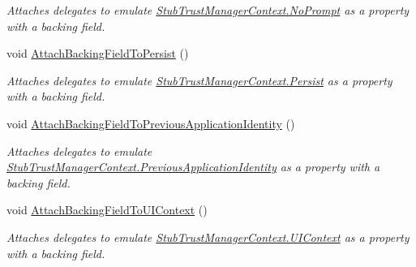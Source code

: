 \begin{DoxyCompactItemize}
\begin{DoxyCompactList}\small\item\em Attaches delegates to emulate \hyperlink{class_system_1_1_security_1_1_policy_1_1_fakes_1_1_stub_trust_manager_context_a2b850b98035e9f991050e27e4cfa82b3}{Stub\-Trust\-Manager\-Context.\-No\-Prompt} as a property with a backing field.\end{DoxyCompactList}\item 
void \hyperlink{class_system_1_1_security_1_1_policy_1_1_fakes_1_1_stub_trust_manager_context_a8a39f950e125296225e9a370f561db00}{Attach\-Backing\-Field\-To\-Persist} ()
\begin{DoxyCompactList}\small\item\em Attaches delegates to emulate \hyperlink{class_system_1_1_security_1_1_policy_1_1_fakes_1_1_stub_trust_manager_context_a8a80981c5b5fdc9f112ca9f1bd5590ab}{Stub\-Trust\-Manager\-Context.\-Persist} as a property with a backing field.\end{DoxyCompactList}\item 
void \hyperlink{class_system_1_1_security_1_1_policy_1_1_fakes_1_1_stub_trust_manager_context_a99462cdad49435924abdbfa1eaac9d42}{Attach\-Backing\-Field\-To\-Previous\-Application\-Identity} ()
\begin{DoxyCompactList}\small\item\em Attaches delegates to emulate \hyperlink{class_system_1_1_security_1_1_policy_1_1_fakes_1_1_stub_trust_manager_context_a607ca6c8527dcd2dd3aedb20d40cab5b}{Stub\-Trust\-Manager\-Context.\-Previous\-Application\-Identity} as a property with a backing field.\end{DoxyCompactList}\item 
void \hyperlink{class_system_1_1_security_1_1_policy_1_1_fakes_1_1_stub_trust_manager_context_a4b4343abb96e0a2b74c09b9daa999203}{Attach\-Backing\-Field\-To\-U\-I\-Context} ()
\begin{DoxyCompactList}\small\item\em Attaches delegates to emulate \hyperlink{class_system_1_1_security_1_1_policy_1_1_fakes_1_1_stub_trust_manager_context_a27fe169ba01ad0c4d2f5cb620e6fcdb6}{Stub\-Trust\-Manager\-Context.\-U\-I\-Context} as a property with a backing field.\end{DoxyCompactList}\end{DoxyCompactItemize}
